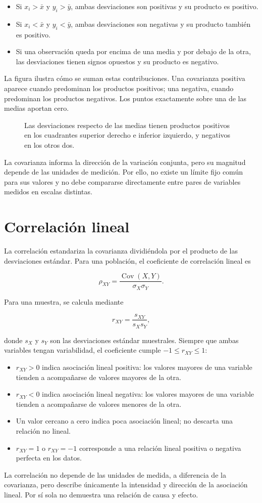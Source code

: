 \begin{itemize}
    \item Si $x_i>\bar{x}$ y $y_i>\bar{y}$, ambas desviaciones son positivas y su producto es positivo.
    \item Si $x_i<\bar{x}$ y $y_i<\bar{y}$, ambas desviaciones son negativas y su producto también es positivo.
    \item Si una observación queda por encima de una media y por debajo de la otra, las desviaciones tienen signos opuestos y su producto es negativo.
\end{itemize}

La figura ilustra cómo se suman estas contribuciones. Una covarianza positiva aparece cuando predominan los productos positivos; una negativa, cuando predominan los productos negativos. Los puntos exactamente sobre una de las medias aportan cero.

\begin{figure}[htbp]
    \centering
    
    \caption{Las desviaciones respecto de las medias tienen productos positivos en los cuadrantes superior derecho e inferior izquierdo, y negativos en los otros dos.}
    \label{fig:signo-covarianza}
\end{figure}

La covarianza informa la dirección de la variación conjunta, pero su magnitud depende de las unidades de medición. Por ello, no existe un límite fijo común para sus valores y no debe compararse directamente entre pares de variables medidos en escalas distintas.

\section{Correlación lineal}

La correlación estandariza la covarianza dividiéndola por el producto de las desviaciones estándar. Para una población, el coeficiente de correlación lineal es

$$
\rho_{XY} = \frac{\operatorname{Cov}(X,Y)}{\sigma_X\sigma_Y}.
$$

Para una muestra, se calcula mediante

$$
r_{XY} = \frac{s_{XY}}{s_Xs_Y},
$$

donde $s_X$ y $s_Y$ son las desviaciones estándar muestrales. Siempre que ambas variables tengan variabilidad, el coeficiente cumple $-1\leq r_{XY}\leq 1$:

\begin{itemize}
    \item $r_{XY}>0$ indica asociación lineal positiva: los valores mayores de una variable tienden a acompañarse de valores mayores de la otra.
    \item $r_{XY}<0$ indica asociación lineal negativa: los valores mayores de una variable tienden a acompañarse de valores menores de la otra.
    \item Un valor cercano a cero indica poca asociación lineal; no descarta una relación no lineal.
    \item $r_{XY}=1$ o $r_{XY}=-1$ corresponde a una relación lineal positiva o negativa perfecta en los datos.
\end{itemize}

La correlación no depende de las unidades de medida, a diferencia de la covarianza, pero describe únicamente la intensidad y dirección de la asociación lineal. Por sí sola no demuestra una relación de causa y efecto.